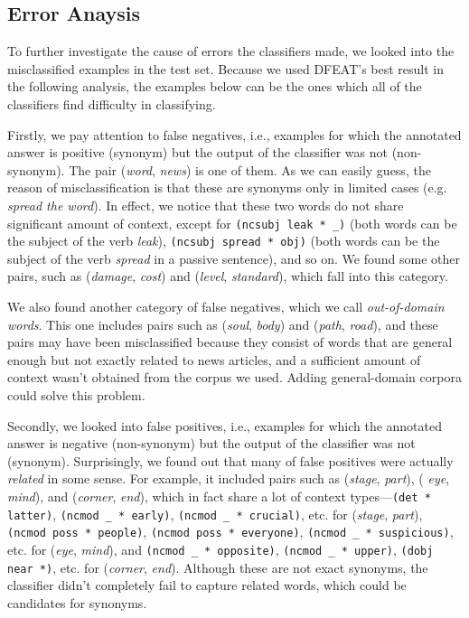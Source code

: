 \documentclass[english]{jnlp_1.4}
\begin{document}
\subsection{Error Anaysis}

To further investigate the cause of errors the classifiers made, we
looked into the misclassified examples in the test set. Because we
used DFEAT's best result in the following analysis, the examples below
can be the ones which all of the classifiers find difficulty in
classifying.

Firstly, we pay attention to false negatives, i.e., examples for which
the annotated answer is positive (synonym) but the output of the
classifier was not (non-synonym). The pair (\textit{word}, \textit{news}) is
one of them. As we can easily guess, the reason of misclassification
is that these are synonyms only in limited cases (e.g. \textit{spread the
word}). In effect, we notice that these two words do not share
significant amount of context, except for {\tt (ncsubj leak * \_)}
(both words can be the subject of the verb \textit{leak}), {\tt (ncsubj
spread * obj)} (both words can be the subject of the verb \textit{spread}
in a passive sentence), and so on. We found some other pairs, such as
(\textit{damage}, \textit{cost}) and (\textit{level}, \textit{standard}), which
fall into this category.

We also found another category of false negatives, which we call {\em
out-of-domain words}. This one includes pairs such as (\textit{soul},
\textit{body}) and (\textit{path}, \textit{road}), and these pairs may have
been misclassified because they consist of words that are general
enough but not exactly related to news articles, and a sufficient
amount of context wasn't obtained from the corpus we used. Adding
general-domain corpora could solve this problem.

Secondly, we looked into false positives, i.e., examples for which the
annotated answer is negative (non-synonym) but the output of the
classifier was not (synonym). Surprisingly, we found out that many of
false positives were actually \textit{related} in some sense. For
example, it included pairs such as (\textit{stage}, \textit{part}), ({\em
eye}, \textit{mind}), and (\textit{corner}, \textit{end}), which in fact share
a lot of context types---{\tt (det * latter)}, {\tt (ncmod \_ *
early)}, {\tt (ncmod \_ * crucial)}, etc. for (\textit{stage}, {\em
part}), {\tt (ncmod poss * people)}, {\tt (ncmod poss * everyone)},
{\tt (ncmod \_ * suspicious)}, etc. for (\textit{eye}, \textit{mind}), and
{\tt (ncmod \_ * opposite)}, {\tt (ncmod \_ * upper)}, {\tt (dobj near
*)}, etc. for (\textit{corner}, \textit{end}). Although these are not exact
synonyms, the classifier didn't completely fail to capture related
words, which could be candidates for synonyms.
\end{document}
